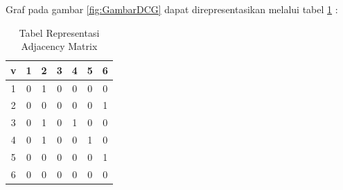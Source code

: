 Graf pada gambar \ref{fig:GambarDCG} dapat direpresentasikan melalui tabel \ref{tabelDCG} :

\begin{table}[H]
\centering
\caption{Tabel Representasi Adjacency Matrix}
\begin{tabular}{|c|c|c|c|c|c|c|}
\hline
v & 1 & 2 & 3 & 4 & 5 & 6 \\
\hline
1 & 0 & 1 & 0 & 0 & 0 & 0 \\
\hline
2 & 0 & 0 & 0 & 0 & 0 & 1 \\
\hline
3 & 0 & 1 & 0 & 1 & 0 & 0 \\
\hline
4 & 0 & 1 & 0 & 0 & 1 & 0 \\
\hline
5 & 0 & 0 & 0 & 0 & 0 & 1 \\
\hline
6 & 0 & 0 & 0 & 0 & 0 & 0 \\
\hline
\end{tabular}
\label{tabelDCG}
\end{table}
